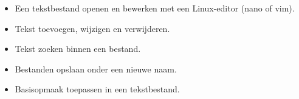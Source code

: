\begin{itemize}
\item Een tekstbestand openen en bewerken met een Linux-editor (nano of vim).
\item Tekst toevoegen, wijzigen en verwijderen.
\item Tekst zoeken binnen een bestand.
\item Bestanden opslaan onder een nieuwe naam.
\item Basisopmaak toepassen in een tekstbestand.
\end{itemize}

